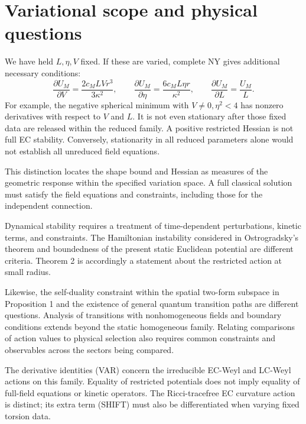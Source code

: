 \section{Variational scope and physical questions}
\label{sec:revised9}

We have held $L,\eta,V$ fixed. If these are varied, complete NY gives additional necessary conditions:
\begin{equation}
\frac{\partial U_M}{\partial V}
=\frac{2c_M L V r^3}{3\kappa^2},
\qquad
\frac{\partial U_M}{\partial\eta}
=\frac{6c_M L\eta r}{\kappa^2},
\qquad
\frac{\partial U_M}{\partial L}=\frac{U_M}{L}.
\tag{VAR}\label{eq:VAR}
\end{equation}
For example, the negative spherical minimum with $V\ne0,\eta^2<4$ has nonzero derivatives with respect to $V$ and $L$. It is not even stationary after those fixed data are released within the reduced family. A positive restricted Hessian is not full EC stability. Conversely, stationarity in all reduced parameters alone would not establish all unreduced field equations.

This distinction locates the shape bound and Hessian as measures of the geometric response within the specified variation space. A full classical solution must satisfy the field equations and constraints, including those for the independent connection.

Dynamical stability requires a treatment of time-dependent perturbations, kinetic terms, and constraints. The Hamiltonian instability considered in Ostrogradsky's theorem\cite{Woodard2015} and boundedness of the present static Euclidean potential are different criteria. Theorem 2 is accordingly a statement about the restricted action at small radius.

Likewise, the self-duality constraint within the spatial two-form subspace in Proposition 1 and the existence of general quantum transition paths are different questions. Analysis of transitions with nonhomogeneous fields and boundary conditions extends beyond the static homogeneous family. Relating comparisons of action values to physical selection also requires common constraints and observables across the sectors being compared.

The derivative identities (VAR) concern the irreducible EC-Weyl and LC-Weyl actions on this family. Equality of restricted potentials does not imply equality of full-field equations or kinetic operators. The Ricci-tracefree EC curvature action is distinct; its extra term (SHIFT) must also be differentiated when varying fixed torsion data.
